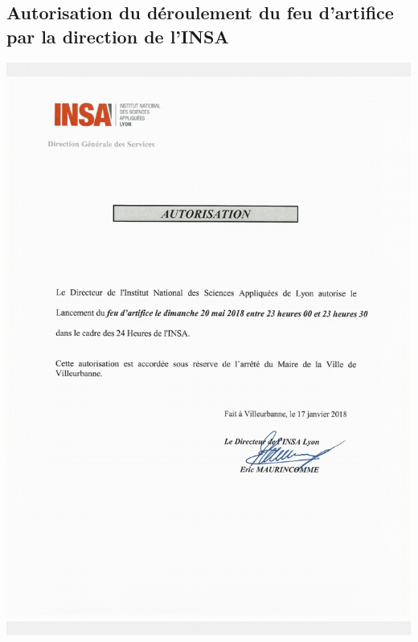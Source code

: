 \documentclass[hidelinks, paper=a4, fontsize=13pt]{report}
\begin{document}
\subsection{Autorisation du déroulement du feu d’artifice par la direction de l’INSA}
\begin{center}
\includegraphics[scale=0.7]{Annexes/Documents/INSAAutorisationFeuArtifice}
\end{center}
\end{document}
